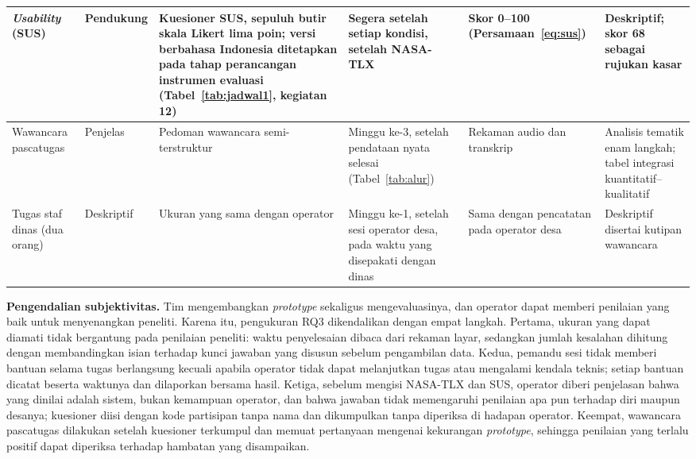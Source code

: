 {\begin{longtable}{|L{0.13\textwidth}|L{0.12\textwidth}|L{0.16\textwidth}|L{0.13\textwidth}|L{0.16\textwidth}|L{0.17\textwidth}|}
\textit{Usability} (SUS) & Pendukung & Kuesioner SUS, sepuluh butir skala Likert lima poin; versi berbahasa Indonesia ditetapkan pada tahap perancangan instrumen evaluasi (Tabel~\ref{tab:jadwal1}, kegiatan 12) & Segera setelah setiap kondisi, setelah NASA-TLX & Skor 0--100 (Persamaan~\eqref{eq:sus}) & Deskriptif; skor 68 sebagai rujukan kasar \\ \hline
Wawancara pascatugas & Penjelas & Pedoman wawancara semi-terstruktur & Minggu ke-3, setelah pendataan nyata selesai (Tabel~\ref{tab:alur}) & Rekaman audio dan transkrip & Analisis tematik enam langkah; tabel integrasi kuantitatif--kualitatif \\ \hline
Tugas staf dinas (dua orang) & Deskriptif & Ukuran yang sama dengan operator & Minggu ke-1, setelah sesi operator desa, pada waktu yang disepakati dengan dinas & Sama dengan pencatatan pada operator desa & Deskriptif disertai kutipan wawancara \\ \hline
\end{longtable}
}

\textbf{Pengendalian subjektivitas.} Tim mengembangkan \textit{prototype} sekaligus mengevaluasinya, dan operator dapat memberi penilaian yang baik untuk menyenangkan peneliti. Karena itu, pengukuran RQ3 dikendalikan dengan empat langkah. Pertama, ukuran yang dapat diamati tidak bergantung pada penilaian peneliti: waktu penyelesaian dibaca dari rekaman layar, sedangkan jumlah kesalahan dihitung dengan membandingkan isian terhadap kunci jawaban yang disusun sebelum pengambilan data. Kedua, pemandu sesi tidak memberi bantuan selama tugas berlangsung kecuali apabila operator tidak dapat melanjutkan tugas atau mengalami kendala teknis; setiap bantuan dicatat beserta waktunya dan dilaporkan bersama hasil. Ketiga, sebelum mengisi NASA-TLX dan SUS, operator diberi penjelasan bahwa yang dinilai adalah sistem, bukan kemampuan operator, dan bahwa jawaban tidak memengaruhi penilaian apa pun terhadap diri maupun desanya; kuesioner diisi dengan kode partisipan tanpa nama dan dikumpulkan tanpa diperiksa di hadapan operator. Keempat, wawancara pascatugas dilakukan setelah kuesioner terkumpul dan memuat pertanyaan mengenai kekurangan \textit{prototype}, sehingga penilaian yang terlalu positif dapat diperiksa terhadap hambatan yang disampaikan.

